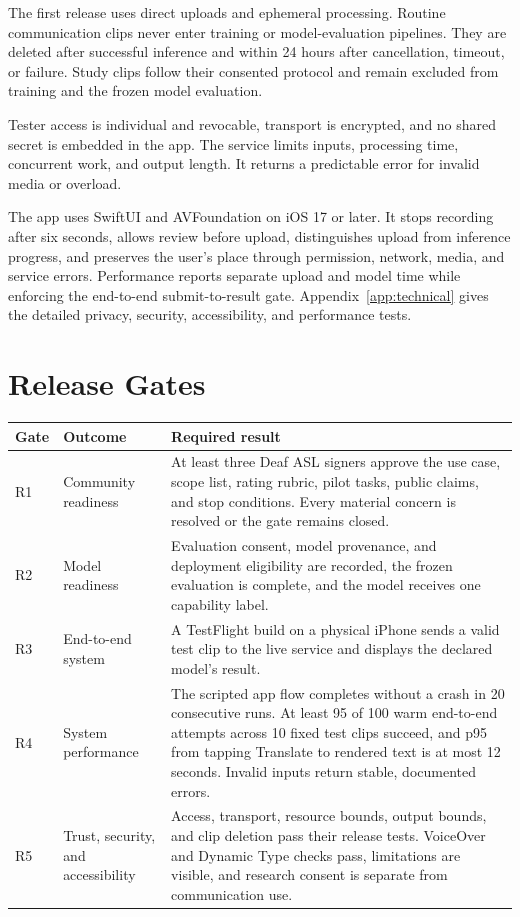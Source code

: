 \documentclass[11pt]{article}
\begin{document}
The first release uses direct uploads and ephemeral processing. Routine communication
clips never enter training or model-evaluation pipelines. They are deleted after
successful inference and within 24 hours after cancellation, timeout, or failure.
Study clips follow their consented protocol and remain excluded from training and the
frozen model evaluation.

Tester access is individual and revocable, transport is encrypted, and no shared
secret is embedded in the app. The service limits inputs, processing time, concurrent
work, and output length. It returns a predictable error for invalid media or overload.

The app uses SwiftUI and AVFoundation on iOS 17 or later. It stops recording after six
seconds, allows review before upload, distinguishes upload from inference progress,
and preserves the user's place through permission, network, media, and service errors.
Performance reports separate upload and model time while enforcing the end-to-end
submit-to-result gate. Appendix~\ref{app:technical} gives the detailed privacy,
security, accessibility, and performance tests.

\section{Release Gates}
\label{sec:release}

\begin{center}
\begin{tabularx}{\textwidth}{@{}P{1.3cm}P{3.4cm}Y@{}}
\toprule
Gate & Outcome & Required result \\
\midrule
R1 & Community readiness & At least three Deaf ASL signers approve the use case,
scope list, rating rubric, pilot tasks, public claims, and stop conditions. Every
material concern is resolved or the gate remains closed. \\
R2 & Model readiness & Evaluation consent, model provenance, and deployment
eligibility are recorded, the frozen evaluation is complete, and the model receives
one capability label. \\
R3 & End-to-end system & A TestFlight build on a physical iPhone sends a valid test clip to
the live service and displays the declared model's result. \\
R4 & System performance & The scripted app flow completes without a crash in 20
consecutive runs. At least 95 of 100 warm end-to-end attempts across 10 fixed test
clips succeed, and p95 from tapping Translate to rendered text is at most 12 seconds.
Invalid inputs return stable, documented errors. \\
R5 & Trust, security, and accessibility & Access, transport, resource bounds, output
bounds, and clip deletion pass their release tests. VoiceOver and Dynamic Type checks
pass, limitations are visible, and research consent is separate from communication
use. \\
\bottomrule
\end{tabularx}
\end{center}
\end{document}
